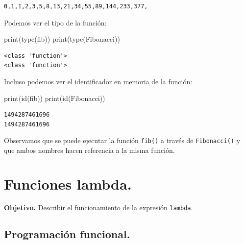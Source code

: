\documentclass[
  spanish,
  letterpaper,
]{scrbook}
\newenvironment{Shaded}{\begin{snugshade}}{\end{snugshade}}
\newcommand{\BuiltInTok}[1]{\textcolor[rgb]{0.00,0.23,0.31}{#1}}
\newcommand{\NormalTok}[1]{\textcolor[rgb]{0.00,0.23,0.31}{#1}}
\theoremstyle{definition}
\theoremstyle{remark}
\begin{document}
\begin{verbatim}
0,1,1,2,3,5,8,13,21,34,55,89,144,233,377,
\end{verbatim}

Podemos ver el tipo de la función:

\begin{Shaded}
\begin{Highlighting}[]
\BuiltInTok{print}\NormalTok{(}\BuiltInTok{type}\NormalTok{(fib))}
\BuiltInTok{print}\NormalTok{(}\BuiltInTok{type}\NormalTok{(Fibonacci))}
\end{Highlighting}
\end{Shaded}

\begin{verbatim}
<class 'function'>
<class 'function'>
\end{verbatim}

Incluso podemos ver el identificador en memoria de la función:

\begin{Shaded}
\begin{Highlighting}[]
\BuiltInTok{print}\NormalTok{(}\BuiltInTok{id}\NormalTok{(fib))}
\BuiltInTok{print}\NormalTok{(}\BuiltInTok{id}\NormalTok{(Fibonacci))}
\end{Highlighting}
\end{Shaded}

\begin{verbatim}
1494287461696
1494287461696
\end{verbatim}

Observamos que se puede ejecutar la función \texttt{fib()} a través de
\texttt{Fibonacci()} y que ambos nombres hacen referencia a la misma
función.

\chapter{Funciones lambda.}\label{sec-p-lambda}

\textbf{Objetivo.} Describir el funcionamiento de la expresión
\texttt{lambda}.

\section{Programación funcional.}\label{sec-p-programacion-funcional}
\end{document}
